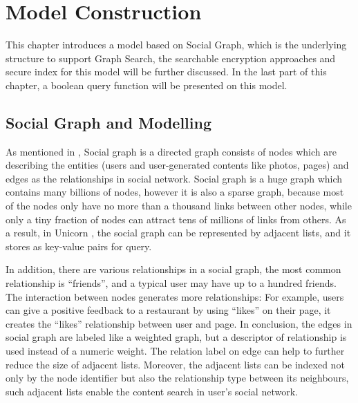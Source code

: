 \chapter{Model Construction}
This chapter introduces a model based on Social Graph, which is the underlying structure to support Graph Search, the searchable encryption approaches and secure index for this model will be further discussed. In the last part of this chapter, a boolean query function will be presented on this model.

\section{Social Graph and Modelling}
As mentioned in \cite{curtiss2013unicorn}, Social graph is a directed graph consists of nodes which are describing the entities (users and user-generated contents like photos, pages) and edges as the relationships in social network. Social graph is a huge graph which contains many billions of nodes, however it is also a sparse graph, because most of the nodes only have no more than a thousand links between other nodes, while only a tiny fraction of nodes can attract tens of millions of links from others. As a result, in Unicorn \cite{curtiss2013unicorn}, the social graph can be represented by adjacent lists, and it stores as key-value pairs for query. 

In addition, there are various relationships in a social graph, the most common relationship is ``friends'', and a typical user may have up to a hundred friends. The interaction between nodes generates more relationships: For example, users can give a positive feedback to a restaurant by using ``likes'' on their page, it creates the ``likes'' relationship between user and page. In conclusion, the edges in social graph are labeled like a weighted graph, but a descriptor of relationship is used instead of a numeric weight. The relation label on edge can help to further reduce the size of adjacent lists. Moreover, the adjacent lists can be indexed not only by the node identifier but also the relationship type between its neighbours, such adjacent lists enable the content search in user's social network.

